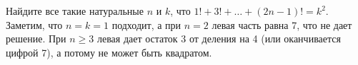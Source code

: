 \problem
Найдите все такие натуральные $n$ и $k$, что
$1! + 3! + \ldots + (2 n - 1)! = k^2$.
\solution
Заметим, что $n = k = 1$ подходит, а при $n = 2$ левая часть равна 7,
что не дает решение.
При $n \geq 3$ левая дает остаток 3 от деления на 4 (или оканчивается цифрой 7),
а потому не может быть квадратом.
\endproblem
